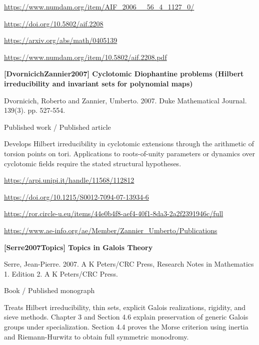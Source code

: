 \documentclass[11pt,a4paper,oneside,openany]{book}
\begin{document}
{\footnotesize\url{https://www.numdam.org/item/AIF_2006__56_4_1127_0/}}\par
{\footnotesize\url{https://doi.org/10.5802/aif.2208}}\par
{\footnotesize\url{https://arxiv.org/abs/math/0405139}}\par
{\footnotesize\url{https://www.numdam.org/item/10.5802/aif.2208.pdf}}\par
\vspace{9pt}
\hypertarget{ref:DvornicichZannier2007}{}
{\sffamily\bfseries\color{atlasgreen}[DvornicichZannier2007] Cyclotomic Diophantine problems (Hilbert irreducibility and invariant sets for polynomial maps)}\par
\color{black} Dvornicich, Roberto and Zannier, Umberto. 2007. Duke Mathematical Journal. 139(3). pp. 527-554.\par
{\small\sffamily\color{atlasgold}Published work / Published article}\par
\color{black} Develops Hilbert irreducibility in cyclotomic extensions through the arithmetic of torsion points on tori. Applications to roots-of-unity parameters or dynamics over cyclotomic fields require the stated structural hypotheses.\par
{\footnotesize\url{https://arpi.unipi.it/handle/11568/112812}}\par
{\footnotesize\url{https://doi.org/10.1215/S0012-7094-07-13934-6}}\par
{\footnotesize\url{https://ror.circle-u.eu/items/44e0b4f8-aef4-40f1-8da3-2a2f2391946c/full}}\par
{\footnotesize\url{https://www.ae-info.org/ae/Member/Zannier_Umberto/Publications}}\par
\vspace{9pt}
\hypertarget{ref:Serre2007Topics}{}
{\sffamily\bfseries\color{atlasgreen}[Serre2007Topics] Topics in Galois Theory}\par
\color{black} Serre, Jean-Pierre. 2007. A K Peters/CRC Press, Research Notes in Mathematics 1. Edition 2. A K Peters/CRC Press.\par
{\small\sffamily\color{atlasgold}Book / Published monograph}\par
\color{black} Treats Hilbert irreducibility, thin sets, explicit Galois realizations, rigidity, and sieve methods. Chapter 3 and Section 4.6 explain preservation of generic Galois groups under specialization. Section 4.4 proves the Morse criterion using inertia and Riemann-Hurwitz to obtain full symmetric monodromy.\par
\end{document}
